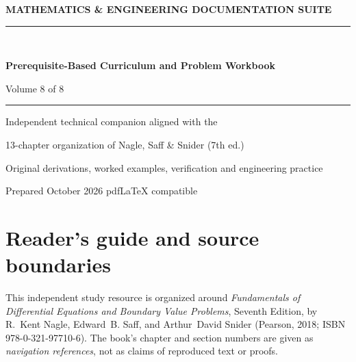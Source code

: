 \documentclass[11pt,letterpaper,oneside]{report}
\theoremstyle{definition}\newtheorem{definition}[theorem]{Definition}
\theoremstyle{remark}\newtheorem{remark}[theorem]{Remark}
\begin{document}
\hypersetup{pageanchor=false}%
\begin{titlepage}
\pagecolor{navy}\color{white}
\vspace*{0.75in}
{\sffamily\bfseries\large MATHEMATICS \& ENGINEERING DOCUMENTATION SUITE\\[12pt]}
{\color{cyan!40}\rule{\textwidth}{2pt}}\\[1.0in]
{\sffamily\bfseries\fontsize{29}{36}\selectfont Prerequisite-Based Curriculum and Problem Workbook\par}
\vspace{0.45in}
{\Large Volume 8 of 8}\par\vspace{0.55in}
{\color{cyan!30}\rule{0.50\textwidth}{1pt}}\par\vspace{0.3in}
{\large Independent technical companion aligned with the\par}
{\large 13-chapter organization of Nagle, Saff \& Snider (7th ed.)\par}
\vfill
{\large Original derivations, worked examples, verification and engineering practice\par}\vspace{0.3in}
{\small Prepared October 2026 \quad\textbullet\quad pdf\LaTeX{} compatible\par}
\end{titlepage}\hypersetup{pageanchor=true}
\nopagecolor\color{ink}
\chapter*{Reader's guide and source boundaries}
This independent study resource is organized around \emph{Fundamentals of Differential Equations and Boundary Value Problems}, Seventh Edition, by R.~Kent Nagle, Edward~B. Saff, and Arthur~David Snider (Pearson, 2018; ISBN 978-0-321-97710-6). The book's chapter and section numbers are given as \emph{navigation references}, not as claims of reproduced text or proofs.
\end{document}
